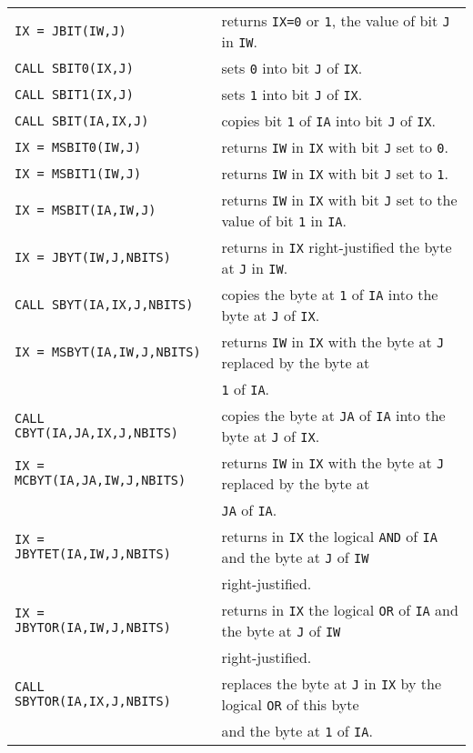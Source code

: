 \documentclass[]{cernman}
\begin{document}
\begin{tabular}{@{\hspace*{3mm}}ll}
{\tt IX = JBIT(IW,J)}
& returns \texttt{IX=0} or \texttt{1}, the value of bit {\tt J} in
{\tt IW}.\\
{\tt CALL SBIT0(IX,J)}
& sets {\tt 0} into bit {\tt J} of {\tt IX}.\\
{\tt CALL SBIT1(IX,J)}
& sets {\tt 1} into bit {\tt J} of {\tt IX}.\\
{\tt CALL SBIT(IA,IX,J)}
& copies bit {\tt 1} of {\tt IA} into bit {\tt J} of {\tt IX}.\\
{\tt IX = MSBIT0(IW,J)}
& returns {\tt IW} in {\tt IX} with bit {\tt J} set to {\tt 0}.\\
{\tt IX = MSBIT1(IW,J)}
& returns {\tt IW} in {\tt IX} with bit {\tt J} set to {\tt 1}.\\
{\tt IX = MSBIT(IA,IW,J)}
& returns {\tt IW} in {\tt IX} with bit {\tt J} set to the value of bit
{\tt 1} in {\tt IA}. \\
{\tt IX = JBYT(IW,J,NBITS)}
& returns in {\tt IX} right-justified the byte at {\tt J} in {\tt IW}.\\
{\tt CALL SBYT(IA,IX,J,NBITS)}
& copies the byte at {\tt 1} of {\tt IA} into the byte at {\tt J} of
{\tt IX}. \\
{\tt IX = MSBYT(IA,IW,J,NBITS)}
& returns {\tt IW} in {\tt IX} with the byte at {\tt J} replaced by the
byte at \\
& {\tt 1} of {\tt IA}. \\
{\tt CALL CBYT(IA,JA,IX,J,NBITS)}
& copies the byte at {\tt JA} of {\tt IA} into the byte at {\tt J} of
{\tt IX}. \\
{\tt IX = MCBYT(IA,JA,IW,J,NBITS)}
& returns {\tt IW} in {\tt IX} with the byte at {\tt J} replaced by the
byte at \\
& {\tt JA} of {\tt IA}. \\
{\tt IX = JBYTET(IA,IW,J,NBITS)}
& returns in {\tt IX} the logical {\tt AND} of {\tt IA} and the byte at
{\tt J} of {\tt IW} \\
& right-justified. \\
{\tt IX = JBYTOR(IA,IW,J,NBITS)}
& returns in {\tt IX} the logical {\tt OR} of {\tt IA} and the byte at
{\tt J} of {\tt IW} \\
& right-justified. \\
{\tt CALL SBYTOR(IA,IX,J,NBITS)}
& replaces the byte at {\tt J} in {\tt IX} by the logical {\tt OR} of
this byte \\
& and the byte at {\tt 1} of {\tt IA}. \\

\end{tabular}
\end{document}
